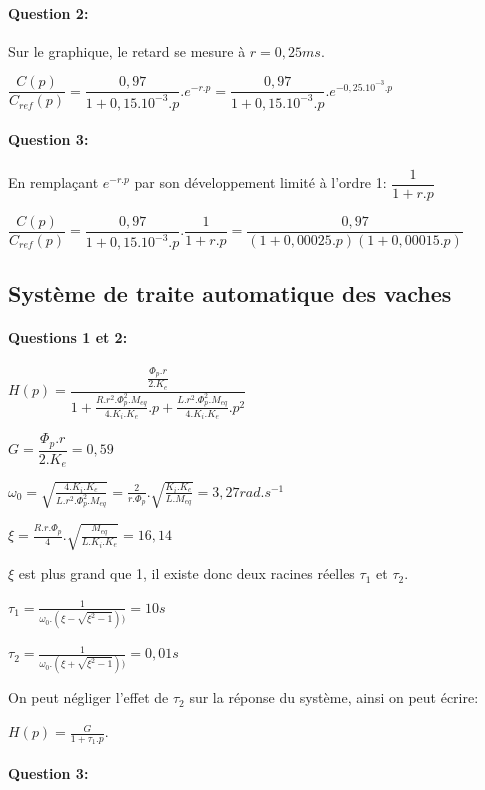 \paragraph{Question 2:} Sur le graphique, le retard se mesure à $r=0,25ms$.

$\dfrac{C(p)}{C_{ref}(p)}=\dfrac{0,97}{1+0,15.10^{-3}.p}.e^{-r.p}=\dfrac{0,97}{1+0,15.10^{-3}.p}.e^{-0,25.10^{-3}.p}$

\paragraph{Question 3:} En remplaçant $e^{-r.p}$ par son développement limité à l'ordre 1: $\dfrac{1}{1+r.p}$

$\dfrac{C(p)}{C_{ref}(p)}=\dfrac{0,97}{1+0,15.10^{-3}.p}.\dfrac{1}{1+r.p}=\dfrac{0,97}{(1+0,00025.p)(1+0,00015.p)}$

\subsection{Système de traite automatique des vaches}

\paragraph{Questions 1 et 2:} 

$H(p)=\dfrac{\frac{\Phi_p.r}{2.K_e}}{1+\frac{R.r^2.\Phi_p^2.M_{eq}}{4.K_i.K_e}.p+\frac{L.r^2.\Phi_p^2.M_{eq}}{4.K_i.K_e}.p^2}$

$G=\dfrac{\Phi_p.r}{2.K_e}=0,59$

$\omega_0=\sqrt{\frac{4.K_i.K_e}{L.r^2.\Phi_p^2.M_{eq}}}=\frac{2}{r.\Phi_p}.\sqrt{\frac{K_i.K_e}{L.M_{eq}}}=3,27rad.s^{-1}$

$\xi=\frac{R.r.\Phi_p}{4}.\sqrt{\frac{M_{eq}}{L.K_i.K_e}}=16,14$

$\xi$ est plus grand que 1, il existe donc deux racines réelles $\tau_1$ et $\tau_2$.

$\tau_1=\frac{1}{\omega_0.(\xi-\sqrt{\xi^2-1}))}=10s$

$\tau_2=\frac{1}{\omega_0.(\xi+\sqrt{\xi^2-1}))}=0,01s$

On peut négliger l'effet de $\tau_2$ sur la réponse du système, ainsi on peut écrire:

$H(p)=\frac{G}{1+\tau_1.p}$.

\paragraph{Question 3:}

